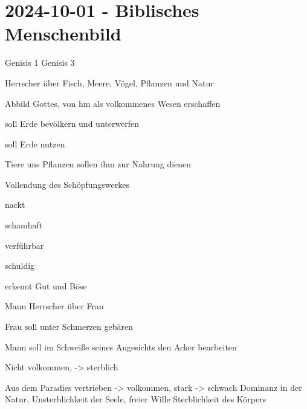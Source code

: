 \section{2024-10-01 - Biblisches Menschenbild}

\NC Genisis 1 \VL Genisis 3 \FR
\HL
\NC
\startitemize[packed]
\item Herrscher über Fisch, Meere, Vögel, Pflanzen und Natur
\item Abbild Gottes, von hm als volkommenes Wesen erschaffen
\item soll Erde bevölkern und unterwerfen
\item soll Erde nutzen
\item Tiere uns Pflanzen sollen ihm zur Nahrung dienen
\item Vollendung des Schöpfungswerkes
\stopitemize
\VL
\startitemize[packed]
\item nackt
\item schamhaft
\item verführbar
\item schuldig
\item erkennt Gut und Böse
\item Mann Herrscher über Frau
\item Frau soll unter Schmerzen gebären
\item Mann soll im Schweiße seines Angesichts den Acker bearbeiten
\item Nicht volkommen,  -> sterblich
\item Aus dem Paradies vertrieben
\stopitemize
\MR
\HL
\NC -> volkommen, stark \VL -> schwach \LR
\HL
\NC Dominanz in der Natur, Unsterblichkeit der Seele, freier Wille
\VL
Sterblichkeit des Körpers
\AR
\stoptable
